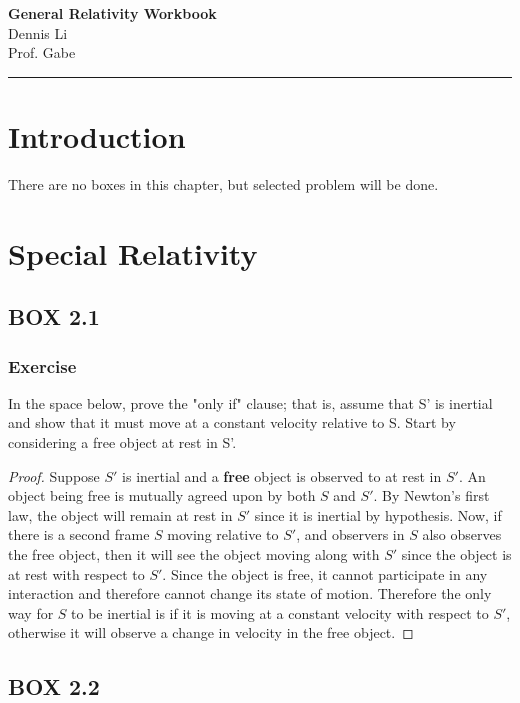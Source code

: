 \documentclass[12pt]{article}
\newif\ifshow
\begin{document}
\begin{center}
\ifshow
  \textbf{\Large GRW Workbook}\\
\else
  \textbf{\Large General Relativity Workbook}\\
\fi
Dennis Li\\Prof. Gabe\\
\end{center}

\hrule

\vspace{0.2cm}

\section{Introduction}
There are no boxes in this chapter, but selected problem will be done.

\section{Special Relativity}
\subsection{BOX 2.1}
\subsubsection{Exercise}
In the space below, prove the "only if" clause; that is, assume that S' is inertial and show that it must move at a constant velocity relative to S. Start by considering a free object at rest in S'.

\begin{proof}
    Suppose $S'$ is inertial and a \textbf{free} object is observed to at rest in $S'$. An object being free is mutually agreed upon by both $S$ and $S'$. By Newton's first law, the object will remain at rest in $S'$ since it is inertial by hypothesis. Now, if there is a second frame $S$ moving relative to $S'$, and observers in $S$ also observes the free object, then it will see the object moving along with $S'$ since the object is at rest with respect to $S'$. Since the object is free, it cannot participate in any interaction and therefore cannot change its state of motion. Therefore the only way for $S$ to be inertial is if it is moving at a constant velocity with respect to $S'$, otherwise it will observe a change in velocity in the free object.  
\end{proof}

\subsection{BOX 2.2}
\end{document}
